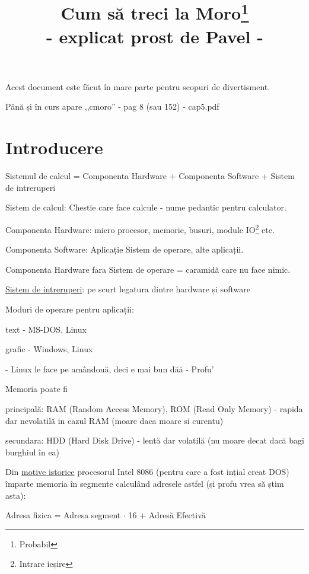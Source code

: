 \documentclass[11pt,a4paper]{article}
\title{Cum să treci la Moro\footnote{Probabil} \\ - \large{explicat prost de Pavel} -}
\date{}
\author{}
\begin{document}
\maketitle

\tableofcontents
\vspace{1em}
Acest document este făcut în mare parte pentru scopuri de divertisment.

Până și în curs apare ,,cmoro'' - pag 8 (sau 152) - cap5.pdf

\section{Introducere}
\begin{center}
  Sistemul de calcul = Componenta Hardware + Componenta Software + Sistem de intreruperi
\end{center}

Sistem de calcul: Chestie care face calcule - nume pedantic pentru calculator.

Componenta Hardware: micro procesor, memorie, busuri, module IO\footnote{Intrare ieșire} etc.

Componenta Software: Aplicație Sistem de operare, alte aplicații.

Componenta Hardware fara Sistem de operare = caramidă care nu face nimic.

\href{https://en.wikipedia.org/wiki/Interrupt}{Sistem de intreruperi}: pe scurt legatura dintre hardware și software

Moduri de operare pentru aplicații:

\quad\quad text - MS-DOS, Linux
  
\quad\quad grafic - Windows, Linux

- Linux le face pe amândouă, deci e mai bun dăă - Profu'

Memoria poate fi

\quad \quad principală: RAM (Random Access Memory), ROM (Read Only Memory)  - rapida dar nevolatilă in cazul RAM (moare daca moare si curentu)

\quad \quad secundara: HDD (Hard Disk Drive) - lentă dar volatilă (nu moare decat dacă bagi burghiul în ea)

Din \href{https://www.quora.com/Why-does-8086-use-segmentation}{motive istorice} procesorul Intel 8086 (pentru care a fost ințial creat DOS) împarte memoria în segmente calculând adresele astfel (și profu vrea să știm asta):
\begin{center}
  Adresa fizica = Adresa segment $\cdot$ 16 + Adresă Efectivă
\end{center}
\end{document}
